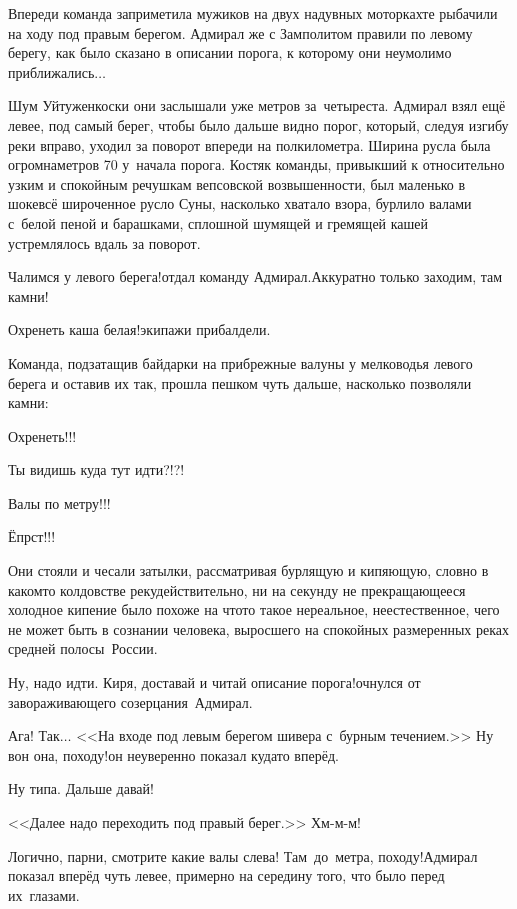 Впереди команда заприметила мужиков на двух надувных моторках\mdash те рыбачили на ходу под правым берегом. Адмирал же с Замполитом правили по левому берегу, как было сказано в описании порога, к которому они неумолимо приближались$\dots$ 

Шум Уйтуженкоски они заслышали уже метров за~четыреста. Адмирал взял ещё левее, под самый берег, чтобы было дальше видно порог, который, следуя изгибу реки вправо, уходил за поворот впереди на полкилометра. Ширина русла была огромна\mdash метров 70 у~начала порога. Костяк команды, привыкший к относительно узким и спокойным речушкам вепсовской возвышенности, был маленько в шоке\mdash всё широченное русло Суны, насколько хватало взора, бурлило валами с~белой пеной и барашками, сплошной шумящей и гремящей кашей устремлялось вдаль за поворот.

\diagdash Чалимся у левого берега!\mdash отдал команду Адмирал.\mdash Аккуратно только заходим, там камни!

\diagdash Охренеть каша белая!\mdash экипажи прибалдели.

Команда, подзатащив байдарки на прибрежные валуны у мелководья левого берега и оставив их так, прошла пешком чуть дальше, насколько позволяли камни:

\diagdash Охренеть!!!

\diagdash Ты видишь куда тут идти?!?!

\diagdash Валы по метру!!!

\diagdash Ёпрст!!!

Они стояли и чесали затылки, рассматривая бурлящую и кипяющую, словно в каком\sdash то колдовстве реку\mdash действительно, ни на секунду не прекращающееся холодное кипение было похоже на что\sdash то такое нереальное, неестественное, чего не может быть в сознании человека, выросшего на спокойных размеренных реках средней полосы~России.

\diagdash Ну, надо идти. Киря, доставай и читай описание порога!\mdash очнулся от завораживающего созерцания~Адмирал.

\diagdash Ага! Так$\ldots$ <<На входе под левым берегом шивера с~бурным течением.>> Ну вон она, походу!\mdash он неуверенно показал куда\sdash то вперёд.

\diagdash Ну типа. Дальше давай!

\diagdash <<Далее надо переходить под правый берег.>> Хм-м-м!

\diagdash Логично, парни, смотрите какие валы слева! Там~до~метра, походу!\mdash Адмирал показал вперёд чуть левее, примерно на середину того, что было перед их~глазами.

